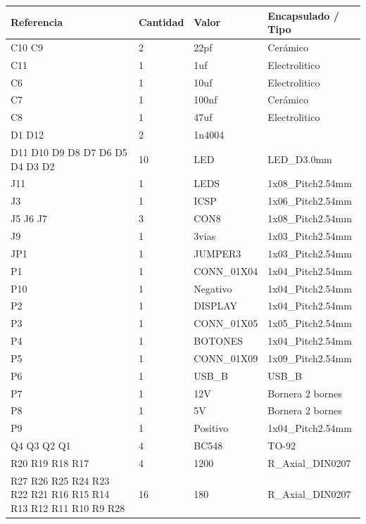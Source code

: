 \begin{table}[htb]
	\begin{tabular}{|p{}|p{}|p{}|p{}|}
		\hline
		\textbf{Referencia} & \multicolumn{1}{l|}{\textbf{Cantidad}} & \textbf{Valor} & \textbf{Encapsulado} / Tipo \\ \hline
		C10 C9 & 2 & 22pf & Cerámico \\ \hline
		C11 & 1 & 1uf & Electrolitico \\ \hline
		C6 & 1 & 10uf & Electrolitico \\ \hline
		C7 & 1 & 100nf & Cerámico \\ \hline
		C8 & 1 & 47uf & Electrolitico \\ \hline
		D1 D12 & 2 & 1n4004 &  \\ \hline
		D11 D10 D9 D8 D7 D6 D5 
		D4 D3 D2 & 10 & LED & LED\_D3.0mm \\ \hline
		J11 & 1 & LEDS & 1x08\_Pitch2.54mm \\ \hline
		J3 & 1 & ICSP & 1x06\_Pitch2.54mm \\ \hline
		J5 J6 J7 & 3 & CON8 & 1x08\_Pitch2.54mm \\ \hline
		J9 & 1 & 3vias & 1x03\_Pitch2.54mm \\ \hline
		JP1 & 1 & JUMPER3 & 1x03\_Pitch2.54mm \\ \hline
		P1 & 1 & CONN\_01X04 & 1x04\_Pitch2.54mm \\ \hline
		P10 & 1 & Negativo & 1x04\_Pitch2.54mm \\ \hline
		P2 & 1 & DISPLAY & 1x04\_Pitch2.54mm \\ \hline
		P3 & 1 & CONN\_01X05 & 1x05\_Pitch2.54mm \\ \hline
		P4 & 1 & BOTONES & 1x04\_Pitch2.54mm \\ \hline
		P5 & 1 & CONN\_01X09 & 1x09\_Pitch2.54mm \\ \hline
		P6 & 1 & USB\_B & USB\_B \\ \hline
		P7 & 1 & 12V & Bornera 2 bornes \\ \hline
		P8 & 1 & 5V & Bornera 2 bornes \\ \hline
		P9 & 1 & Positivo & 1x04\_Pitch2.54mm \\ \hline
		Q4 Q3 Q2 Q1 & 4 & BC548 & TO-92 \\ \hline
		R20 R19 R18 R17 & 4 & 1200 & R\_Axial\_DIN0207 \\ \hline
		R27 R26 R25 R24 R23 R22 
		R21 R16 R15 R14 R13 R12 
		R11 R10 R9 R28 & 16 & 180 & R\_Axial\_DIN0207 \\ \hline

\end{tabular}
\end{table}
